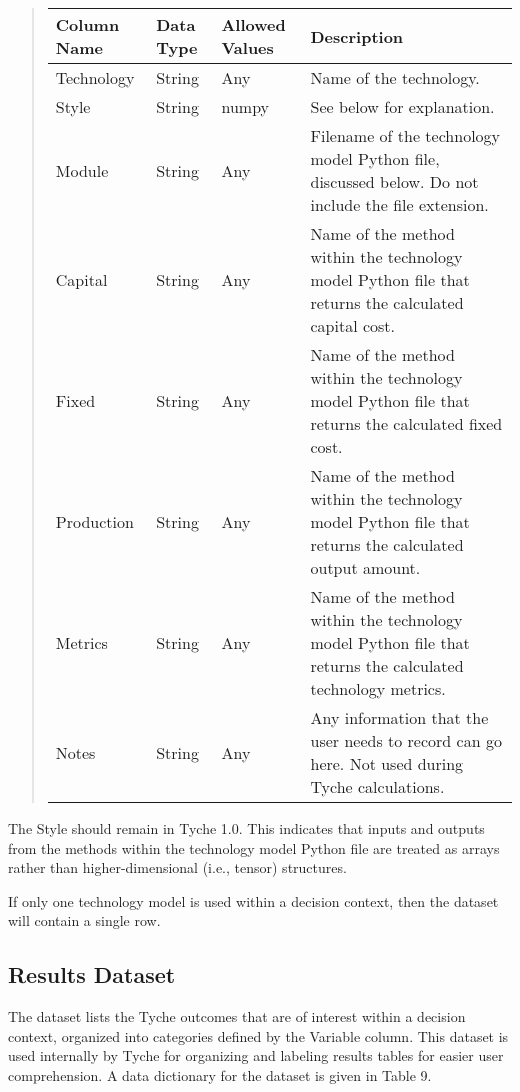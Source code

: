 \documentclass[letterpaper,10pt,english]{sphinxmanual}
\begin{document}
\begin{quote}


\begin{savenotes}\sphinxattablestart
\centering
\begin{tabulary}{\linewidth}[t]{|T|T|T|T|}
\hline
\sphinxstyletheadfamily 
Column Name
&\sphinxstyletheadfamily 
Data Type
&\sphinxstyletheadfamily 
Allowed Values
&\sphinxstyletheadfamily 
Description
\\
\hline
Technology
&
String
&
Any
&
Name of the technology.
\\
\hline
Style
&
String
&
numpy
&
See below for explanation.
\\
\hline
Module
&
String
&
Any
&
Filename of the technology model Python file, discussed below. Do not include the file extension.
\\
\hline
Capital
&
String
&
Any
&
Name of the method within the technology model Python file that returns the calculated capital cost.
\\
\hline
Fixed
&
String
&
Any
&
Name of the method within the technology model Python file that returns the calculated fixed cost.
\\
\hline
Production
&
String
&
Any
&
Name of the method within the technology model Python file that returns the calculated output amount.
\\
\hline
Metrics
&
String
&
Any
&
Name of the method within the technology model Python file that returns the calculated technology metrics.
\\
\hline
Notes
&
String
&
Any
&
Any information that the user needs to record can go here. Not used during Tyche calculations.
\\
\hline
\end{tabulary}
\par
\sphinxattableend\end{savenotes}
\end{quote}

The Style should remain  in Tyche 1.0. This indicates that inputs and outputs from the methods within the technology model Python file are treated as arrays rather than higher-dimensional (i.e., tensor) structures.

If only one technology model is used within a decision context, then the  dataset will contain a single row.


\subsection{Results Dataset}
\label{\detokenize{cheat-sheet:results-dataset}}
The  dataset lists the Tyche outcomes that are of interest within a decision context, organized into categories defined by the Variable column. This dataset is used internally by Tyche for organizing and labeling results tables for easier user comprehension. A data dictionary for the  dataset is given in Table 9.
\end{document}
